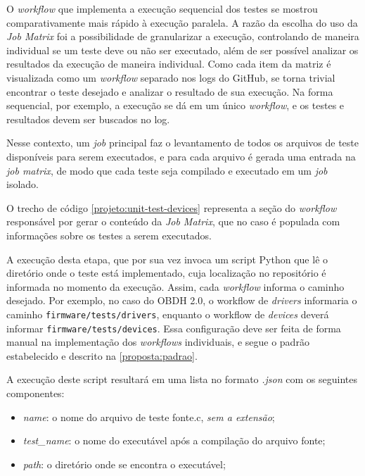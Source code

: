             O \textit{workflow} que implementa a execução sequencial dos testes se mostrou comparativamente mais rápido à execução paralela. A razão da escolha do uso da \textit{Job Matrix} foi a possibilidade de granularizar a execução, controlando de maneira individual se um teste deve ou não ser executado, além de ser possível analizar os resultados da execução de maneira individual. Como cada item da matriz é visualizada como um \textit{workflow} separado nos logs do GitHub, se torna trivial encontrar o teste desejado e analizar o resultado de sua execução. Na forma sequencial, por exemplo, a execução se dá em um único \textit{workflow}, e os testes e resultados devem ser buscados no log.
            
            Nesse contexto, um \textit{job} principal faz o levantamento de todos os arquivos de teste disponíveis para serem executados, e para cada arquivo é gerada uma entrada na \textit{job matrix}, de modo que cada teste seja compilado e executado em um \textit{job} isolado.
            
            O trecho de código \autoref{projeto:unit-test-devices} representa a seção do \textit{workflow} responsável por gerar o conteúdo da \textit{Job Matrix}, que no caso é populada com informações sobre os testes a serem executados.
            
            
            
            
            A execução desta etapa, que por sua vez invoca um script Python que lê o diretório onde o teste está implementado, cuja localização no repositório é informada no momento da execução. Assim, cada \textit{workflow} informa o caminho desejado. Por exemplo, no caso do OBDH 2.0, o workflow de \textit{drivers} informaria o caminho \texttt{firmware/tests/drivers}, enquanto o workflow de \textit{devices} deverá informar \texttt{firmware/tests/devices}. Essa configuração deve ser feita de forma manual na implementação dos \textit{workflows} individuais, e segue o padrão estabelecido e descrito na \autoref{proposta:padrao}.
            
            A execução deste script resultará em uma lista no formato \textit{.json} com os seguintes componentes:
            
            \begin{itemize}
                \item \textit{name}: o nome do arquivo de teste fonte.c, \textit{sem a extensão};
                \item \textit{test\_name}: o nome do executável após a compilação do arquivo fonte;
                \item \textit{path}: o diretório onde se encontra o executável;
            \end{itemize}
            
